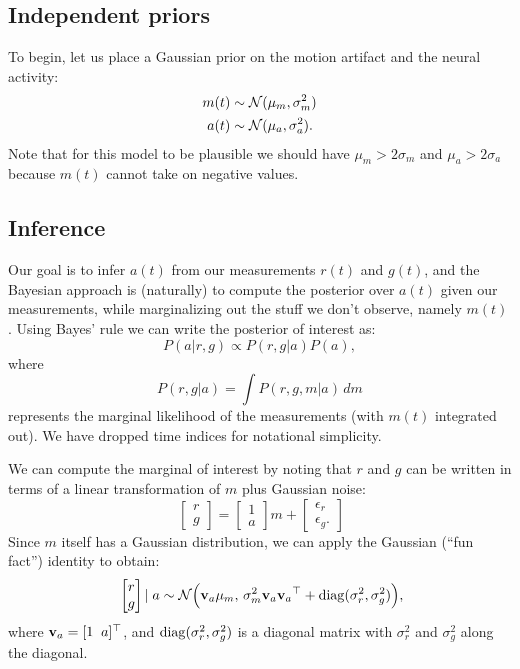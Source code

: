 \documentclass[11pt]{article}
\newcommand{\vr}{\sigma^2_r}
\newcommand{\vm}{\sigma^2_m}
\newcommand{\vg}{\sigma^2_g}
\newcommand{\va}{\sigma^2_a}
\newcommand{\vecv}{\mathbf{v}}
\begin{document}
\subsection{Independent priors}

To begin, let us place a Gaussian prior on the motion artifact and the neural activity:
\begin{align}
m(t) &\sim \Nrm(\mu_m, \vm) \label{eq:mprior} \\
a(t) &\sim \Nrm(\mu_a, \va). \label{eq:aprior}
\end{align}
Note that for this model to be plausible we should have $\mu_m >
2\sigma_m$ and $\mu_a > 2\sigma_a$ because $m(t)$ cannot take on
negative values.

\subsection{Inference} 
Our goal is to infer $a(t)$ from our measurements $r(t)$ and $g(t)$,
and the Bayesian approach is (naturally) to compute the posterior over
$a(t)$ given our measurements, while marginalizing out the stuff we
don't observe, namely $m(t)$.  Using Bayes' rule we can write the
posterior of interest as:
\begin{equation}
P(a | r, g) \propto P(r,g | a) P(a),
\end{equation}
where \begin{equation}
 P(r,g | a) = \int P(r, g, m | a)\, dm 
\end{equation}
represents the marginal likelihood of the measurements (with $m(t)$
integrated out).  We have dropped time indices for notational simplicity.

We can compute the marginal of interest by noting that $r$ and $g$ can
be written in terms of a linear transformation of $m$ plus Gaussian noise:
\begin{equation}
\
\begin{bmatrix}
  r \\ g 
\end{bmatrix} = 
\begin{bmatrix}
  1 \\ a 
\end{bmatrix}m  + 
\begin{bmatrix}
  \epsilon_r \\ \epsilon_g.
\end{bmatrix} 
\end{equation}
Since $m$ itself has a Gaussian distribution, we can apply the
Gaussian (``fun fact'') identity to obtain:
\begin{equation} \label{eq:iidmargli}
\
\begin{bmatrix}
  r \\ g 
\end{bmatrix} | \; a \sim \Nrm \Big( \vecv_a \mu_m,\,  \vm \vecv_a  \vecv_a\trp +
\diag(\vr,\vg) \Big),  
\end{equation}
where $\vecv_a = [1\;\; a]\trp$, and $\diag(\vr,\vg)$ is a diagonal
matrix with $\vr$ and $\vg$ along the diagonal.
\end{document}
